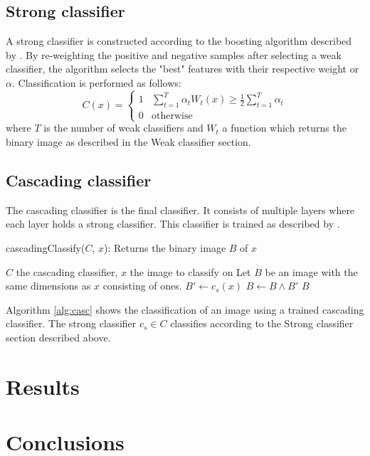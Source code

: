 \documentclass[a4paper,11pt]{article}
\begin{document}
\subsection*{Strong classifier}
A strong classifier is constructed according to the boosting algorithm
described by \cite{viola}.  By re-weighting the positive and
negative samples after selecting a weak classifier, the algorithm selects the
"best" features with their respective weight or $\alpha$. Classification is
performed as follows:
\begin{displaymath}
C(x) = 
	\left\{ \begin{array}{ll}
		1 & \sum^T_{t=1} \alpha_t W_t(x) \ge \frac{1}{2} \sum^T_{t=1}\alpha_t \\
		0 & \textrm{otherwise}
	\end{array} \right.
\end{displaymath}
where $T$ is the number of weak classifiers and $W_t$ a function which returns
the binary image as described in the Weak classifier section.

\subsection*{Cascading classifier}
The cascading classifier is the final classifier. It consists of multiple
layers where each layer holds a strong classifier. This classifier is
trained as described by \cite{viola}. 
\begin{algorithm}
	\caption{cascadingClassify($C$, $x$): Returns the binary image $B$ of $x$}
	\begin{algorithmic}[1]
	\REQUIRE $C$ the cascading classifier, $x$ the image to classify on
	\medskip
	\STATE Let $B$ be an image with the same dimensions as $x$ consisting of ones.
		\STATE $B' \leftarrow c_s(x)$
		\STATE $B \leftarrow B \land B'$
	\ENDFOR
	\RETURN $B$
	\end{algorithmic}
\label{alg:casc}
\end{algorithm}
Algorithm \ref{alg:casc} shows the classification of an image using a trained
cascading classifier. The strong classifier $c_s \in C$ classifies according to
the Strong classifier section described above.

\section*{Results}

\section*{Conclusions}

\renewcommand\bibname{References}


\end{document}
